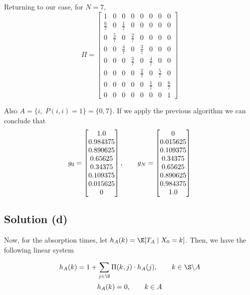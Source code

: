 Returning to our case, for $N = 7$,
\[ \Pi = \left[\begin{matrix}1 & 0 & 0 & 0 & 0 & 0 & 0 & 0\\\frac{6}{7} & 0 & \frac{1}{7} & 0 & 0 & 0 & 0 & 0\\0 & \frac{5}{7} & 0 & \frac{2}{7} & 0 & 0 & 0 & 0\\0 & 0 & \frac{4}{7} & 0 & \frac{3}{7} & 0 & 0 & 0\\0 & 0 & 0 & \frac{3}{7} & 0 & \frac{4}{7} & 0 & 0\\0 & 0 & 0 & 0 & \frac{2}{7} & 0 & \frac{5}{7} & 0\\0 & 0 & 0 & 0 & 0 & \frac{1}{7} & 0 & \frac{6}{7}\\0 & 0 & 0 & 0 & 0 & 0 & 0 & 1\end{matrix}\right] \]

Also $A = \{i,\; P(i,i) = 1\} = \{0,7\}$. If we apply the previous algorithm we can conclude that
\[ g_0 = \left[\begin{matrix}1.0\\0.984375\\0.890625\\0.65625\\0.34375\\0.109375\\0.015625\\0\end{matrix}\right],\hspace*{2em} g_N = \left[\begin{matrix}0\\0.015625\\0.109375\\0.34375\\0.65625\\0.890625\\0.984375\\1.0\end{matrix}\right] \]

\subsection*{Solution (d)}

Now, for the absorption times, let $h_A(k) = \E[T_A \;|\; X_0 = k]$. Then, we have the following linear system

\[ h_A(k) = 1 + \sum_{j \in \S} \Pi(k,j)\cdot h_A(j),\hspace*{2em} k \in \S \backslash A \]
\[ h_A(k) = 0,\hspace*{2em} k \in A \]

